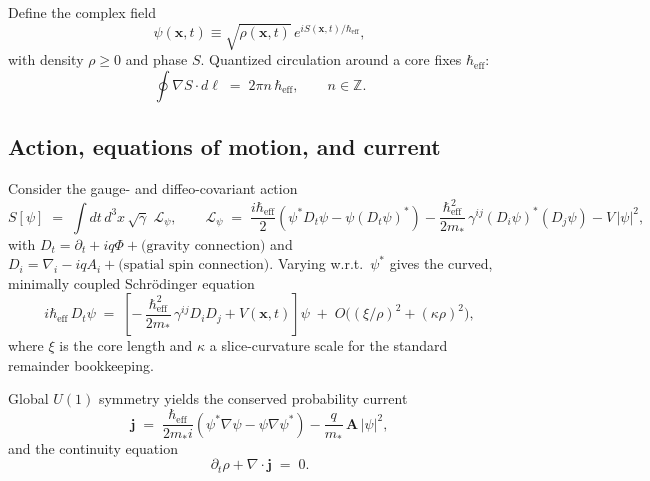 Define the complex field
\begin{equation}
\psi(\mathbf{x},t) \equiv \sqrt{\rho(\mathbf{x},t)}\,e^{i S(\mathbf{x},t)/\hbar_{\mathrm{eff}}}, 
\label{eq:psi_polar}
\end{equation}
with density \(\rho\ge 0\) and phase \(S\). Quantized circulation around a core fixes \(\hbar_{\mathrm{eff}}\):
\begin{equation}
\oint \nabla S \cdot d\boldsymbol{\ell} \;=\; 2\pi n\,\hbar_{\mathrm{eff}}, \qquad n\in\mathbb{Z}.
\label{eq:circulation-quant}
\end{equation}

\subsection{Action, equations of motion, and current}
\label{sec:QM_action}

Consider the gauge- and diffeo-covariant action
\begin{equation}
S[\psi] \;=\; \int dt\, d^3x\, \sqrt{\gamma}\;\mathcal{L}_\psi,\qquad
\mathcal{L}_\psi \;=\; \frac{i\hbar_{\mathrm{eff}}}{2}\!\left(\psi^* D_t\psi - \psi (D_t\psi)^*\right)
- \frac{\hbar_{\mathrm{eff}}^2}{2m_*}\,\gamma^{ij}(D_i\psi)^*(D_j\psi) - V\,|\psi|^2 ,
\label{eq:Spsi_full}
\end{equation}
with \(D_t=\partial_t + iq\Phi + \text{(gravity connection)}\) and \(D_i=\nabla_i - iqA_i + \text{(spatial spin connection)}\). Varying w.r.t.\ \(\psi^*\) gives the curved, minimally coupled Schr\"odinger equation
\begin{equation}
i\hbar_{\mathrm{eff}}\,D_t \psi \;=\; \left[-\,\frac{\hbar_{\mathrm{eff}}^2}{2m_*}\,\gamma^{ij}D_i D_j + V(\mathbf{x},t)\right]\psi
\;+\; O\!\Big((\xi/\rho)^2 + (\kappa\rho)^2\Big),
\label{eq:schrodinger}
\end{equation}
where \(\xi\) is the core length and \(\kappa\) a slice-curvature scale for the standard remainder bookkeeping.

Global \(U(1)\) symmetry yields the conserved probability current
\begin{equation}
\mathbf j \;=\; \frac{\hbar_{\mathrm{eff}}}{2m_* i}\left(\psi^* \nabla \psi - \psi \nabla \psi^* \right) - \frac{q}{m_*}\,\mathbf A\,|\psi|^2,
\label{eq:current}
\end{equation}
and the continuity equation
\begin{equation}
\partial_t \rho + \nabla\!\cdot\!\mathbf j \;=\; 0.
\label{eq:continuity}
\end{equation}

